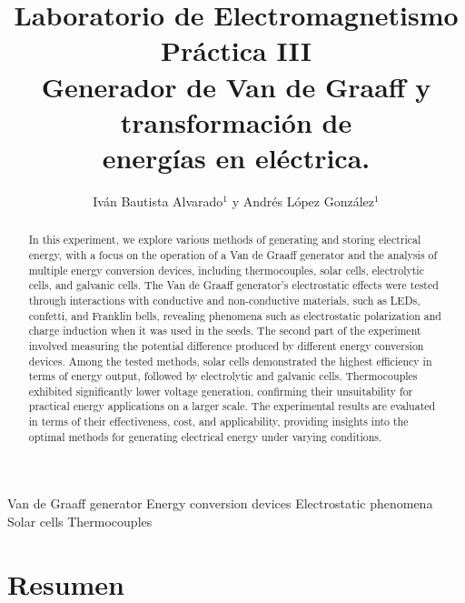 \documentclass[article,12pt]{elsarticle}
\begin{document}
\begin{frontmatter}
    \title{Laboratorio de Electromagnetismo \\
    Práctica III\\ 
    Generador de Van de Graaff y transformación de \\ energías en eléctrica.}

    \author{Iván Bautista Alvarado$^1$ y Andrés López González$^1$} %
    \address{$^1$ Facultad de Ciencias, Universidad Nacional Autónoma de México, M\'exico CDMX.}

    \begin{abstract}

In this experiment, we explore various methods of generating and storing electrical energy, with a focus on the operation of a Van de Graaff generator and the analysis of multiple energy conversion devices, including thermocouples, solar cells, electrolytic cells, and galvanic cells. The Van de Graaff generator's electrostatic effects were tested through interactions with conductive and non-conductive materials, such as LEDs, confetti, and Franklin bells, revealing phenomena such as electrostatic polarization and charge induction when it was used in the seeds. The second part of the experiment involved measuring the potential difference produced by different energy conversion devices. Among the tested methods, solar cells demonstrated the highest efficiency in terms of energy output, followed by electrolytic and galvanic cells. Thermocouples exhibited significantly lower voltage generation, confirming their unsuitability for practical energy applications on a larger scale. The experimental results are evaluated in terms of their effectiveness, cost, and applicability, providing insights into the optimal methods for generating electrical energy under varying conditions.

    \end{abstract}


    \begin{keyword}
Van de Graaff generator
Energy conversion devices
Electrostatic phenomena
Solar cells
Thermocouples
    \end{keyword}

\end{frontmatter}

    \section*{Resumen}
\end{document}
